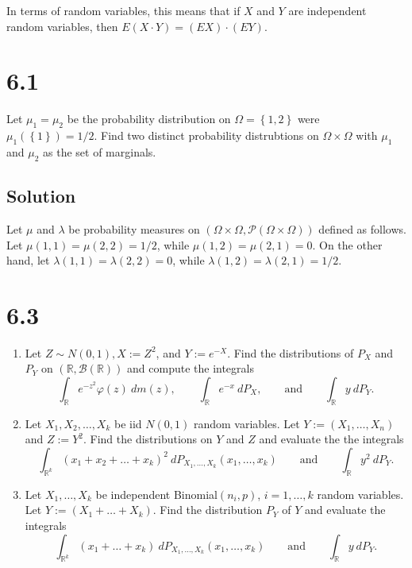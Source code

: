 \documentclass[12pt]{article}
\begin{document}
In terms of random variables, this means that if $X$ and $Y$ are independent random variables, then $E(X\cdot Y) = (EX)\cdot(EY)$.







\newpage 
\section*{6.1}
Let $\mu_{1} = \mu_{2}$ be the probability distribution on $\Omega = \left\{ 1,2 \right\}$ were $\mu_{1}(\left\{ 1 \right\}) = 1/2$. Find two distinct
probability distrubtions on $\Omega \times \Omega$ with $\mu_{1}$ and $\mu_{2}$ as the set of marginals.

\subsection*{Solution}
Let $\mu$ and $\lambda$ be probability measures on $(\Omega \times \Omega, \mathcal{P}(\Omega\times \Omega))$ defined as follows. 
Let $\mu(1,1) = \mu(2,2) = 1/2$, while $\mu(1,2) = \mu(2,1) = 0$. On the other hand, let $\lambda(1,1) = \lambda(2,2) = 0$, while $\lambda(1,2) =
\lambda(2,1) = 1/2$.






\newpage 
\section*{6.3}
\begin{enumerate}[label=(\alph*)]
\item Let $Z \sim N(0,1), X := Z^{2}$, and $Y := e^{-X}$. Find the distributions of $P_{X}$ and $P_{Y}$ on $(\mathbb{R}, \mathcal{B}(\mathbb{R}))$ and
compute the integrals
\[ \int_{\mathbb{R}}e^{-z^{2}}\varphi(z)\ dm(z), \qquad \int_{\mathbb{R}}e^{-x}\ dP_{X}, \qquad \text{and} \qquad \int_{\mathbb{R}}y\ dP_{Y}. \]
\item Let $X_{1}, X_{2}, \hdots, X_{k}$ be iid $N(0,1)$ random variables. Let $Y := (X_{1}, \dots, X_{n})$ and $Z := Y^{2}$. Find the distributions
on $Y$ and $Z$ and evaluate the the integrals
\[ \int_{\mathbb{R}^{k}}(x_{1} + x_{2} + \dots + x_{k})^{2}\ dP_{X_{1},\hdots,X_{k}}(x_{1},\hdots,x_{k}) \qquad\text{and}\qquad \int_{\mathbb{R}}y^{2}\ dP_{Y}. \]
\item Let $X_{1}, \hdots, X_{k}$ be independent Binomial$(n_{i}, p)$, $i = 1, \hdots, k$ random variables. Let $Y := (X_{1} + \dots + X_{k})$. Find
the distribution $P_{Y}$ of $Y$ and evaluate the integrals 
\[ \int_{\mathbb{R}^{k}}(x_{1} + \dots + x_{k})\ dP_{X_{1},\hdots,X_{k}}(x_{1},\hdots,x_{k}) \qquad \text{and} \qquad \int_{\mathbb{R}}y\ dP_{Y}. \]
\end{enumerate}
\end{document}
